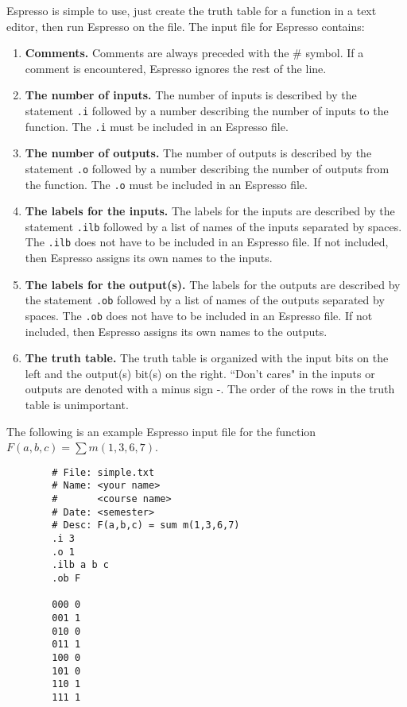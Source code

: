 Espresso is simple to use, just create the truth table for 
a function in a text editor, then run Espresso on the file.
The input file for Espresso contains:
\begin{enumerate}
\item \textbf{ Comments.}  Comments are always preceded with 
the \# symbol.  If a comment is encountered, Espresso 
ignores the rest of the line.

\item \textbf{ The number of inputs.}
The number of inputs is 
described by the statement \verb+.i+ followed by a 
number describing the number of inputs to the function. 
The \verb+.i+  must be included in an Espresso file.

\item \textbf{ The number of outputs.}
The number of outputs 
is described by the statement \verb+.o+ followed by 
a number describing the number of outputs from the function. 
The \verb+.o+ must be included in an Espresso file.

\item \textbf{ The labels for the inputs.}
The labels for the inputs are described by the statement \verb+.ilb+ 
followed by a list of names of the inputs separated by spaces.  
The \verb+.ilb+ does not have to be included in an
Espresso file.  If not included, then Espresso assigns its
own names to the inputs.

\item \textbf{ The labels for the output(s).}
The labels for the outputs are described by the statement \verb+.ob+ 
followed by a list of names of the outputs separated by spaces.
The \verb+.ob+ does not have to be included in an
Espresso file.  If not included, then Espresso assigns its
own names to the outputs.

\item \textbf{ The truth table.}
The truth table is organized with the input bits on the left and the 
output(s) bit(s) on the right.  ``Don't cares" in the inputs or outputs
are denoted with a minus sign -.  The order of the rows in the truth
table is unimportant.  

\end{enumerate}

The following is an example Espresso input file for the function
$F(a,b,c) = \sum m(1,3,6,7)$.  

\begin{verbatim}
        # File: simple.txt
        # Name: <your name>
        #       <course name>
        # Date: <semester>
        # Desc: F(a,b,c) = sum m(1,3,6,7)
        .i 3
        .o 1
        .ilb a b c
        .ob F
        
        000 0
        001 1
        010 0
        011 1
        100 0
        101 0
        110 1
        111 1
\end{verbatim}


